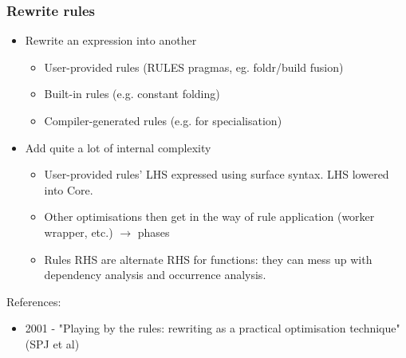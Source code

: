\documentclass[aspectratio=169]{beamer}
\begin{document}
\begin{frame}
  \frametitle{Rewrite rules}
  \begin{itemize}
    \item Rewrite an expression into another
      \begin{itemize}
        \item User-provided rules (RULES pragmas, eg. foldr/build fusion)
        \item Built-in rules (e.g. constant folding)
        \item Compiler-generated rules (e.g. for specialisation)
      \end{itemize}
    \item Add quite a lot of internal complexity
      \begin{itemize}
        \item User-provided rules' LHS expressed using surface syntax. LHS
          lowered into Core.
        \item Other optimisations then get in the way of rule application (worker wrapper, etc.)
          $\rightarrow$ phases
        \item Rules RHS are alternate RHS for functions: they can mess up with
          dependency analysis and occurrence analysis.
      \end{itemize}
  \end{itemize}

  References:
  \begin{itemize}
    \item 2001 - "Playing by the rules: rewriting as a practical optimisation
      technique" (SPJ et al)
  \end{itemize}
\end{frame}
\end{document}
